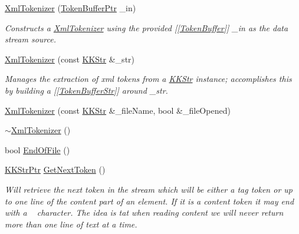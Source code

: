 \begin{DoxyCompactItemize}
\item 
\hyperlink{class_k_k_b_1_1_xml_tokenizer_a75eb55df92764c7143a6a39106a1c974}{Xml\+Tokenizer} (\hyperlink{namespace_k_k_b_ae97804d25124b4a5dba3b3637beb814a}{Token\+Buffer\+Ptr} \+\_\+in)
\begin{DoxyCompactList}\small\item\em Constructs a \hyperlink{class_k_k_b_1_1_xml_tokenizer}{Xml\+Tokenizer} using the provided \mbox{[}\mbox{[}\hyperlink{class_k_k_b_1_1_token_buffer}{Token\+Buffer}\mbox{]}\mbox{]} \+\_\+in as the data stream source. \end{DoxyCompactList}\item 
\hyperlink{class_k_k_b_1_1_xml_tokenizer_aaa2cc9be39962f0d58a4143835f86f2b}{Xml\+Tokenizer} (const \hyperlink{class_k_k_b_1_1_k_k_str}{K\+K\+Str} \&\+\_\+str)
\begin{DoxyCompactList}\small\item\em Manages the extraction of xml tokens from a \hyperlink{class_k_k_b_1_1_k_k_str}{K\+K\+Str} instance; accomplishes this by building a \mbox{[}\mbox{[}\hyperlink{class_k_k_b_1_1_token_buffer_str}{Token\+Buffer\+Str}\mbox{]}\mbox{]} around \+\_\+str. \end{DoxyCompactList}\item 
\hyperlink{class_k_k_b_1_1_xml_tokenizer_a8e7e08be08beb2ebb6b33df6358648eb}{Xml\+Tokenizer} (const \hyperlink{class_k_k_b_1_1_k_k_str}{K\+K\+Str} \&\+\_\+file\+Name, bool \&\+\_\+file\+Opened)
\item 
\hyperlink{class_k_k_b_1_1_xml_tokenizer_a1e436ff467ed359ff1870fb1b45cff4c}{$\sim$\+Xml\+Tokenizer} ()
\item 
bool \hyperlink{class_k_k_b_1_1_xml_tokenizer_a044ac313b8e9f5a49e7bde9b8665e426}{End\+Of\+File} ()
\item 
\hyperlink{namespace_k_k_b_a9adbef5a6b3be0867f5570df2a08f388}{K\+K\+Str\+Ptr} \hyperlink{class_k_k_b_1_1_xml_tokenizer_a7214f4cd0fc6026fe5fe827ba7ad1f2f}{Get\+Next\+Token} ()
\begin{DoxyCompactList}\small\item\em Will retrieve the next token in the stream which will be either a tag token or up to one line of the content part of an element. If it is a content token it may end with a \textquotesingle{}~\newline
\textquotesingle{} character. The idea is tat when reading content we will never return more than one line of text at a time. \end{DoxyCompactList}\item 

\end{DoxyCompactItemize}
